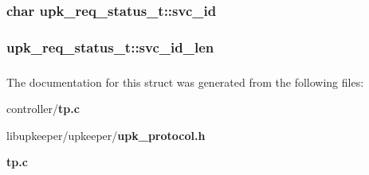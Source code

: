 \subsubsection[{svc\_\-id}]{\setlength{\rightskip}{0pt plus 5cm}char {\bf upk\_\-req\_\-status\_\-t::svc\_\-id}}\label{structupk__req__status__t_a0f60c412404e907aea2e156bb824d327}
\subsubsection[{svc\_\-id\_\-len}]{ {\bf upk\_\-req\_\-status\_\-t::svc\_\-id\_\-len}}\label{structupk__req__status__t_aae63fba8c68647778bd232c354a0ce06}
\subsubsection[{UPK\_\-V0\_\-REQ\_\-STATUS\_\-T\_\-FIELDS}]{}\label{structupk__req__status__t_a87e1da7d16a42b83b5c3b0478943f81d}


The documentation for this struct was generated from the following files:\begin{DoxyCompactItemize}
\item 
controller/{\bf tp.c}\item 
libupkeeper/upkeeper/{\bf upk\_\-protocol.h}\item 
{\bf tp.c}\end{DoxyCompactItemize}
